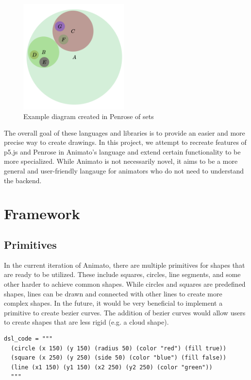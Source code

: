 \documentclass[acmsmall,screen]{acmart}
\begin{document}
\begin{center}
  \begin{figure}[!h]
    \includegraphics[width=0.49\textwidth]{images/penrose.png}
    \caption{Example diagram created in Penrose of sets}
  \end{figure}
\end{center}

\noindent The overall goal of these languages and libraries is to provide an easier and more precise way to create drawings.
In this project, we attempt to recreate features of p5.js and Penrose in Animato's language and extend certain functionality to be more specialized.
While Animato is not necessarily novel, it aims to be a more general and user-friendly langauge for animators who do not need to understand the backend.

\section{Framework}
\subsection{Primitives}
In the current iteration of Animato, there are multiple primitives for shapes that are ready to be utilized.
These include squares, circles, line segments, and some other harder to achieve common shapes. 
While circles and squares are predefined shapes, lines can be drawn and connected with other lines to create more complex shapes.
In the future, it would be very beneficial to implement a primitive to create bezier curves.
The addition of bezier curves would allow users to create shapes that are less rigid (e.g. a cloud shape).


\begin{lstlisting}[label=code, caption=Sample input demonstrating primitives and customizations]
  dsl_code = """
  (circle (x 150) (y 150) (radius 50) (color "red") (fill true))
  (square (x 250) (y 250) (side 50) (color "blue") (fill false))
  (line (x1 150) (y1 150) (x2 250) (y2 250) (color "green"))
  """
\end{lstlisting}
\end{document}
